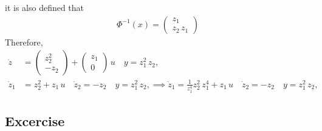 it is also defined that 
\begin{align*}
    \Phi^{-1}(x) = \begin{pmatrix}
        z_1 \\ z_2\,z_1
    \end{pmatrix}
\end{align*}
Therefore, 
\begin{align*}
    \dot z &= \begin{pmatrix}
        z_2^2 \\ -z_2
    \end{pmatrix} + \begin{pmatrix}
        z_1 \\ 0
    \end{pmatrix}\,u \quad y = z_1^2\,z_2, \\
    \dot z_1 &= z_2^2 + z_1\,u \quad \dot z_2 = -z_2 \quad y = z_1^2\,z_2, \implies \dot z_1 = \frac{1}{z_1^4} z_2^2\,z_1^4 + z_1\,u \quad \dot z_2 = -z_2 \quad y = z_1^2\,z_2,
\end{align*}


\subsection*{Excercise}

